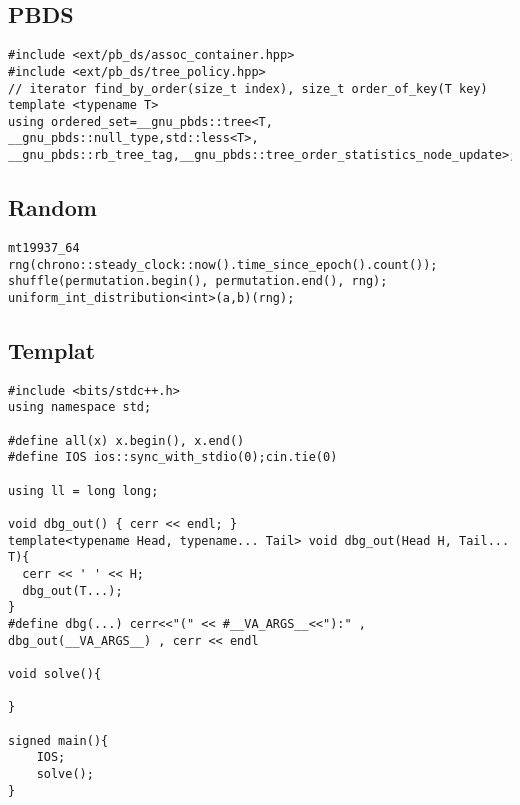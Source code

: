 \documentclass{article}
\begin{document}
\subsection{PBDS}
\begin{verbatim}
#include <ext/pb_ds/assoc_container.hpp>
#include <ext/pb_ds/tree_policy.hpp>
// iterator find_by_order(size_t index), size_t order_of_key(T key)
template <typename T> 
using ordered_set=__gnu_pbds::tree<T, __gnu_pbds::null_type,std::less<T>, __gnu_pbds::rb_tree_tag,__gnu_pbds::tree_order_statistics_node_update>;
\end{verbatim}
\subsection{Random}
\begin{verbatim}
mt19937_64 rng(chrono::steady_clock::now().time_since_epoch().count());
shuffle(permutation.begin(), permutation.end(), rng);
uniform_int_distribution<int>(a,b)(rng);
\end{verbatim}
\subsection{Templat}
\begin{verbatim}
#include <bits/stdc++.h>
using namespace std;

#define all(x) x.begin(), x.end()
#define IOS ios::sync_with_stdio(0);cin.tie(0)

using ll = long long;

void dbg_out() { cerr << endl; }
template<typename Head, typename... Tail> void dbg_out(Head H, Tail... T){ 
  cerr << ' ' << H; 
  dbg_out(T...); 
}
#define dbg(...) cerr<<"(" << #__VA_ARGS__<<"):" , dbg_out(__VA_ARGS__) , cerr << endl

void solve(){
    
}

signed main(){
    IOS;
    solve();
}
\end{verbatim}
\end{document}
